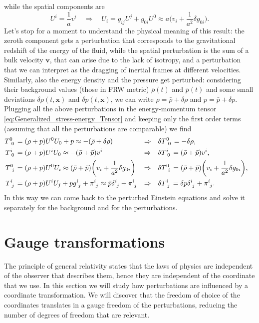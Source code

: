 while the spatial components are
$$U^i=\frac{1}{a}v^i\quad \Rightarrow\quad U_i=g_{ij}U^j+g_{0i}U^0\approx a\bigg(v_i+\frac{1}{a^2}\delta g_{0i}\bigg).$$
Let's stop for a moment to understand the physical meaning of this result: the zeroth component gets a perturbation that corresponds to the gravitational redshift of the energy of the fluid, while the spatial perturbation is the sum of a bulk velocity $\mathbf v$, that can arise due to the lack of isotropy, and a perturbation that we can interpret as the dragging of inertial frames at different velocities.\\
Similarly, also the energy density and the pressure get perturbed: considering their background values (those in FRW metric) $\bar\rho(t)$ and $\bar p(t)$ and some small deviations $\delta\rho(t,\mathbf x)$ and $\delta p(t,\mathbf x)$, we can write $\rho=\bar\rho+\delta\rho$ and $p=\bar p+\delta p$.\\ Plugging all the above perturbations in the energy-momentum tensor \eqref{eq:Generalized_stress-energy_Tensor} and keeping only the first order terms (assuming that all the perturbations are comparable) we find
\begin{align}
    \tensor{T}{^0_0}&=(\rho+p)U^0U_0+p\approx-(\bar\rho+\delta\rho)&\Rightarrow\quad &\delta \tensor{T}{^0_0}=-\delta\rho,\label{eq:perturbed_T00}&&\\
     \tensor{T}{^i_0}&=(\rho+p)U^iU_0\approx -(\bar\rho+\bar p)v^i&\Rightarrow\quad &\delta \tensor{T}{^i_0}=(\bar\rho+\bar p)v^i,\label{eq:perturbed_Ti0}&&\\
    \tensor{T}{^0_i}&=(\rho+p)U^0U_i\approx (\bar\rho+\bar p)\bigg(v_i+\frac{1}{a^2}\delta g_{0i}\bigg)&\Rightarrow\quad &\delta \tensor{T}{^0_i}=(\bar\rho+\bar p)\bigg(v_i+\frac{1}{a^2}\delta g_{0i}\bigg),\label{eq:perturbed_T0i}&&\\
    \tensor{T}{^i_j}&=(\rho+p)U^iU_j+p\tensor{g}{^i_j}+\tensor{\pi}{^i_j}\approx \bar p\tensor{\delta}{^i_j}+\tensor{\pi}{^i_j}  &\Rightarrow\quad &\delta \tensor{T}{^i_j}=\delta p\tensor{\delta}{^i_j}+\tensor{\pi}{^i_j}.\label{eq:perturbed_Tij}&&
\end{align} 
In this way we can come back to the perturbed Einstein equations and solve it separately for the background and for the perturbations.
\section{Gauge transformations}
The principle of general relativity states that the laws of physics are independent of the observer that describes them, hence they are independent of the coordinate that we use. In this section we will study how perturbations are influenced by a coordinate transformation. We will discover that the freedom of choice of the coordinates translates in a gauge freedom of the perturbations, reducing the number of degrees of freedom that are relevant.

